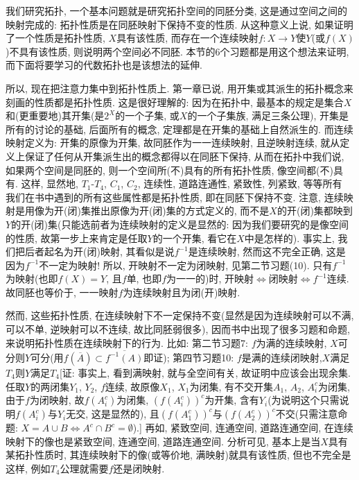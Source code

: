 \documentclass{ctexart}%
\theoremstyle{definition}
\theoremstyle{remark}
\begin{document}
我们研究拓扑, 一个基本问题就是研究拓扑空间的同胚分类, 这是通过空间之间的映射完成的: 拓扑性质是在同胚映射下保持不变的性质. 从这种意义上说, 如果证明了一个性质是拓扑性质, $X$具有该性质, 而存在一个连续映射$f:X\rightarrow Y$使$Y$(或$f(X)$)不具有该性质, 则说明两个空间必不同胚. 本节的6个习题都是用这个想法来证明, 而下面将要学习的代数拓扑也是该想法的延伸. 

所以, 现在把注意力集中到拓扑性质上. 第一章已说, 用开集或其派生的拓扑概念来刻画的性质都是拓扑性质. 这是很好理解的: 因为在拓扑中, 最基本的规定是集合$X$和(更重要地)其开集(是$2^X$的一个子集, 或$X$的一个子集族, 满足三条公理), 开集是所有的讨论的基础, 后面所有的概念, 定理都是在开集的基础上自然派生的. 而连续映射定义为: 开集的原像为开集, 故同胚作为一一连续映射, 且逆映射连续, 就从定义上保证了任何从开集派生出的概念都得以在同胚下保持, 从而在拓扑中我们说, 如果两个空间是同胚的, 则一个空间所(不)具有的所有拓扑性质, 像空间都(不)具有. 这样, 显然地, $T_1$-$T_4$, $C_1$, $C_2$, 连续性, 道路连通性, 紧致性, 列紧致, 等等所有
我们在书中遇到的所有这些属性都是拓扑性质, 即在同胚下保持不变. 注意, 连续映射是用像为开(闭)集推出原像为开(闭)集的方式定义的, 而不是$X$的开(闭)集都映到$Y$的开(闭)集(只能选前者为连续映射的定义是显然的: 因为我们要研究的是像空间的性质, 故第一步上来肯定是任取$Y$的一个开集, 看它在$X$中是怎样的). 事实上, 我们把后者起名为开(闭)映射, 其看似是说$f^{-1}$是连续映射, 然而这不完全正确, 这是因为$f^{-1}$不一定为映射! 所以, 开映射不一定为闭映射, 见第二节习题(10). 只有$f^{-1}$为映射(也即$f(X)=Y$, 且$f$单, 也即$f$为一一的)时, 开映射$\Longleftrightarrow$闭映射$\Longleftrightarrow f^{-1}$连续. 故同胚也等价于, 一一映射$f$为连续映射且为闭(开)映射. 


然而, 这些拓扑性质, 在连续映射下不一定保持不变(显然是因为连续映射可以不满, 可以不单, 逆映射可以不连续, 故比同胚弱很多), 因而书中出现了很多习题和命题, 来说明拓扑性质在连续映射下的行为. 比如: 第二节习题7: $f$为满的连续映射, $X$可分则$Y$可分(用$f(\overline{A})\subset \overline{f^{-1}(A)}$即证); 第四节习题10: $f$是满的连续闭映射,$X$满足$T_4$则$Y$满足$T_4$[证: 事实上, 看到满映射, 就与全空间有关, 故证明中应该会出现余集. 任取$Y$的两闭集$Y_1$, $Y_2$, $f$连续, 故原像$X_1$, $X_1$为闭集, 有不交开集$A_1$, $A_2$, $A^c_i$为闭集, 由于$f$为闭映射, 故$f(A^c_i)$为闭集, $(f(A^c_i))^c$为开集, 含有$Y_i$(为说明这个只需说明$f(A^c_i)$与$Y_i$无交, 这是显然的), 且$(f(A^c_1))^c$与$(f(A^c_2))^c$不交(只需注意命题: $X=A\cup B\Longleftrightarrow A^c\cap B^c=\emptyset$).] 再如, 紧致空间, 连通空间, 道路连通空间, 在连续映射下的像也是紧致空间, 连通空间, 道路连通空间. 分析可见, 基本上是当$X$具有某拓扑性质时, 其连续映射下的像(或等价地, 满映射)就具有该性质, 但也不完全是这样, 例如$T_4$公理就需要$f$还是闭映射. 
\end{document}
